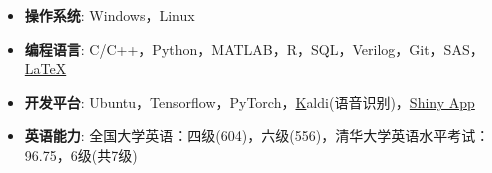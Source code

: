   \begin{itemize}[leftmargin=*]
    \item \textbf{操作系统}: Windows，Linux

    \item \textbf{编程语言}: C/C++，Python，MATLAB，R，SQL，Verilog，Git，SAS，
    \href{http://www.latex-project.org/}{\LaTeX}

    \item \textbf{开发平台}: Ubuntu，Tensorflow，PyTorch，\href{https://sourceforge.net/projects/kaldi/}Kaldi(语音识别)，\href{http://shiny.rstudio.com/}{Shiny App}

    \item \textbf{英语能力}: 全国大学英语：四级(604)，六级(556)，清华大学英语水平考试：96.75，6级(共7级)
  \end{itemize}